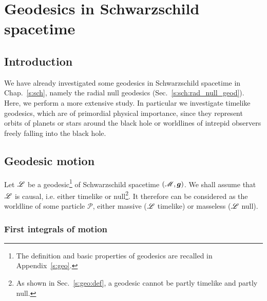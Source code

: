 \chapter{Geodesics in Schwarzschild spacetime}
\label{s:ges}

\minitoc

\section{Introduction}

We have already investigated some geodesics in Schwarzschild spacetime in
Chap.~\ref{s:sch}, namely
the radial null geodesics (Sec.~\ref{s:sch:rad_null_geod}).
Here, we perform a more extensive study. In particular we investigate timelike
geodesics, which are of primordial physical importance, since they represent
orbits of planets or stars around the black hole or worldlines of
intrepid observers freely falling into the black hole.

\section{Geodesic motion}

Let $\mathscr{L}$ be a geodesic\footnote{The definition and basic properties of geodesics
are recalled in Appendix~\ref{s:geo}.} of Schwarzschild spacetime
$(\mathscr{M},\bm{g})$. We shall assume that $\mathscr{L}$ is causal, i.e. either timelike or null\footnote{As
shown in Sec.~\ref{s:geo:def}, a geodesic cannot be partly timelike and partly
null.}. It therefore can be considered as the worldline
of some particle $\mathscr{P}$, either massive
($\mathscr{L}$ timelike) or masseless ($\mathscr{L}$ null).


\subsection{First integrals of motion} \label{s:ges:fiom}

